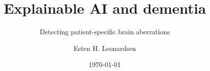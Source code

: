 \documentclass{beamer}
\title{Explainable AI and dementia}
\subtitle{Detecting patient-specific brain aberrations}
\date{\today}
\author{Esten H. Leonardsen}
\begin{document}
    \begin{frame}
        \titlepage
    \end{frame}

    
\end{document}
